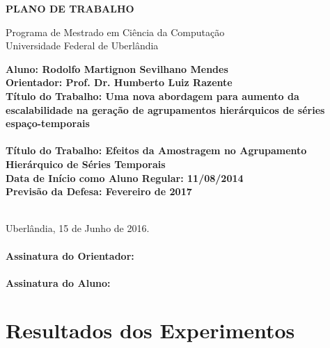 \documentclass[12pt]{article}
\begin{document}


\begin{center}
    \bf{
        \LARGE{PLANO DE TRABALHO}
        \\ $\ $\\
    }
    
    \Large{
        Programa de Mestrado em Ciência da Computação\\
        Universidade Federal de Uberlândia
    }
    \\ $\ $\\
\end{center}

\begin{center}
    \bf{
        Aluno: Rodolfo Martignon Sevilhano Mendes\\ $\ $\\
        Orientador: Prof. Dr. Humberto Luiz Razente\\ $\ $\\
        Título do Trabalho: Uma nova abordagem para aumento da escalabilidade na
				geração de agrupamentos hierárquicos de séries espaço-temporais\\ \ \ \\
        Título do Trabalho: Efeitos da Amostragem no Agrupamento \\
				Hierárquico de Séries Temporais\\ $\ $\\
        Data de Início como Aluno Regular: 11/08/2014\\ $\ $\\
        Previsão da Defesa: Fevereiro de 2017\\ $\ $\\
    }
\end{center}








\begin{flushleft}
\ \\
\noindent Uberlândia, 15 de Junho de 2016. \\
\ \\
\noindent \textbf{Assinatura do Orientador:} \\
\ \\
\noindent \textbf{Assinatura do Aluno:} \\
\end{flushleft}

\newpage




\newpage

\appendix
\section{Resultados dos Experimentos}




\end{document}

